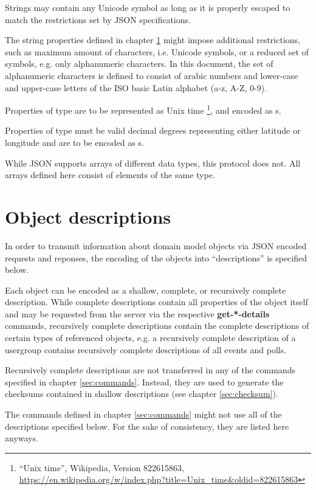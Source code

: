\documentclass[parskip=full,11pt]{scrartcl}
\begin{document}
Strings may contain any Unicode symbol as long as it is properly escaped to
match the restrictions set by JSON specifications.

The string properties defined in chapter \ref{sec:descriptions} might impose
additional restrictions, such as maximum amount of characters, i.e. Unicode
symbols, or a reduced set of symbols, e.g. only alphanumeric characters.
In this document, the set of alphanumeric characters is defined to consist
of arabic numbers and lower-case and upper-case letters of the ISO basic Latin
alphabet (a-z, A-Z, 0-9).

Properties of type  are to be represented as Unix time%
\footnote{\enquote{Unix time}, Wikipedia, Version 822615863,
\url{https://en.wikipedia.org/w/index.php?title=Unix_time&oldid=822615863}},
and encoded as s.

Properties of type  must be valid decimal degrees
representing either latitude or longitude and are to be encoded as
s.

While JSON supports arrays of different data types, this protocol does not.
All arrays defined here consist of elements of the same type.

\section{Object descriptions}\label{sec:descriptions}
In order to transmit information about domain model objects via JSON encoded
requests and reponses, the encoding of the objects into \enquote{descriptions}
is specified below.

Each object can be encoded as a shallow, complete, or recursively
complete description.
While complete descriptions contain all properties of the object itself and
may be requested from the server via the respective \textbf{get-*-details}
commands, recursively complete descriptions contain the complete descriptions
of certain types of referenced objects, e.g. a recursively complete description
of a usergroup contains recursively complete descriptions of all events and
polls.

Recursively complete descriptions are not transferred in any of the
commands specified in chapter \ref{sec:commands}.
Instead, they are used to generate the checksums contained in shallow
descriptions (see chapter \ref{sec:checksum}).

The commands defined in chapter \ref{sec:commands} might not use all of the
descriptions specified below.
For the sake of consistency, they are listed here anyways.
\end{document}
